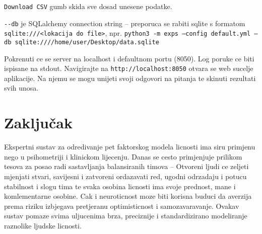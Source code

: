 \documentclass[times, utf8, seminar]{fer}
\begin{document}
\verb|Download CSV| gumb skida sve dosad unesene podatke.

\verb|--db| je SQLalchemy connection string -- preporuca se rabiti sqlite s formatom \texttt{sqlite:///<lokacija do file>}, npr. \texttt{python3 -m exps --config default.yml --db sqlite:////home/user/Desktop/data.sqlite}

Pokrenuti ce se server na localhost i defaultnom portu (8050). Log poruke ce biti ispisane na stdout. Navigirajte na \verb|http://localhost:8050| otvara se web sucelje aplikacije. Na njemu se mogu unijeti svoji odgovori na pitanja te skinuti rezultati svih unosa.

\chapter{Zaključak}

Ekspertni sustav za odredivanje pet faktorskog modela licnosti ima siru primjenu nego u psihometriji i klinickom lijecenju. Danas se cesto primjenjuje prilikom tesova za posao radi sastavljanja balansiranih timova -- Otvoreni ljudi ce zeljeti mjenjati stvari, savijesni i zatvoreni ordazavati red, ugodni odrzadaju i potucu stabilnost i slogu tima te svaka osobina licnosti ima svoje prednost, mane i komlementarne osobine. Cak i neuroticnost moze biti korisna buduci da averzija prema riziku izbjegava pretjeranu optimisticnost i samozavaravanje.
Ovakav sustav pomaze svima uljucenima brza, preciznije i standardizirano modeliranje raznolike ljudske licnosti.




\end{document}

